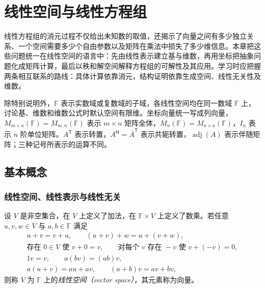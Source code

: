 \setcounter{chapter}{2} %
\chapter{线性空间与线性方程组}
\label{chap:linear-spaces-systems}

线性方程组的消元过程不仅给出未知数的取值，还揭示了向量之间有多少独立关系、一个空间需要多少个自由参数以及矩阵在乘法中损失了多少维信息。本章把这些问题统一在线性空间的语言中：先由线性表示建立基与维数，再用坐标把抽象问题化成矩阵计算，最后以秩和解空间解释方程组的可解性及其应用。学习时应把握两条相互联系的路线：具体计算依靠消元，结构证明依靠生成空间、线性无关性及维数。

除特别说明外，$\mathbb F$ 表示实数域或复数域的子域，各线性空间均在同一数域 $\mathbb F$ 上，讨论基、维数和维数公式时默认空间有限维。坐标向量统一写成列向量，$M_{m\times n}(\mathbb F)=M_{m,n}(\mathbb F)$ 表示 $m\times n$ 矩阵全体，$M_n(\mathbb F)=M_{n\times n}(\mathbb F)$，$I_n$ 表示 $n$ 阶单位矩阵。$A^{\mathsf T}$ 表示转置，$A^{\mathsf H}=\overline A^{\mathsf T}$ 表示共轭转置，$\operatorname{adj}(A)$ 表示伴随矩阵；三种记号所表示的运算不同。

\section{基本概念}
\label{sec:laex-basic}

\subsection{线性空间、线性表示与线性无关}

\begin{definition}
\label{def:laex-vector-space}
设 $V$ 是非空集合，在 $V$ 上定义了加法，在 $\mathbb F\times V$ 上定义了数乘。若任意 $u,v,w\in V$ 与 $a,b\in\mathbb F$ 满足
\[
\begin{gathered}
u+v=v+u,\qquad (u+v)+w=u+(v+w),\\
\text{存在 }0\in V\text{ 使 }v+0=v,\qquad
\text{对每个 }v\text{ 存在 }-v\text{ 使 }v+(-v)=0,\\
1v=v,\qquad a(bv)=(ab)v,\\
a(u+v)=au+av,\qquad (a+b)v=av+bv,
\end{gathered}
\]
则称 $V$ 为 $\mathbb F$ 上的\emph{线性空间（vector space）}，其元素称为向量。
\end{definition}

